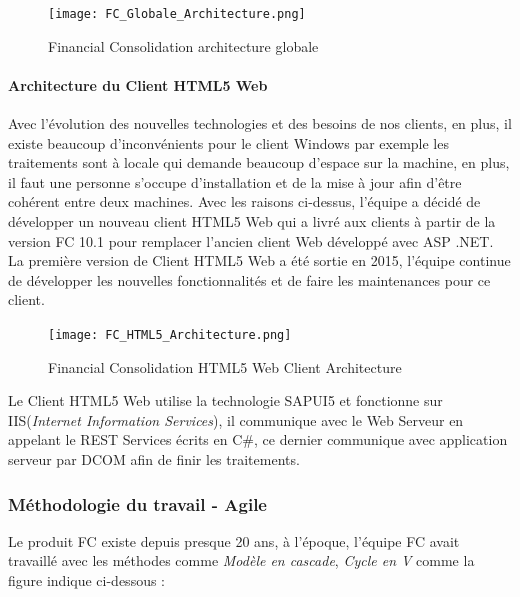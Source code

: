     \begin{figure}[H]
        \centering
        \texttt{[image: FC\_Globale\_Architecture.png]}
        \caption{Financial Consolidation architecture globale}
        \label{fig:FC_architecture_label}
    \end{figure}
    
    \paragraph{Architecture du Client HTML5 Web}
    Avec l'évolution des nouvelles technologies et des besoins de nos clients, en plus, il existe beaucoup d’inconvénients pour le client Windows par exemple les traitements sont à locale qui demande beaucoup d'espace sur la machine, en plus, il faut une personne  s'occupe d'installation et de la mise à jour afin d'être cohérent entre deux machines. Avec les raisons ci-dessus, l'équipe a décidé de développer un nouveau client HTML5 Web qui a livré aux clients à partir de la version FC 10.1 pour remplacer l'ancien client Web développé avec ASP .NET. La première version de Client HTML5 Web a été sortie en 2015, l'équipe continue de développer les nouvelles fonctionnalités et de faire les maintenances pour ce client.
    
    \begin{figure}[H]
        \centering
        \texttt{[image: FC\_HTML5\_Architecture.png]}
        \caption{Financial Consolidation HTML5 Web Client Architecture}
        \label{fig:FC_HTML5_Architecture_label}
    \end{figure}
    
    \par Le Client HTML5 Web utilise la technologie SAPUI5 et fonctionne sur IIS(\textit{Internet Information Services}), il communique avec le Web Serveur en appelant le REST Services écrits en C\#, ce dernier communique avec application serveur par DCOM afin de finir les traitements.
    
    \newpage
    \subsubsection{Méthodologie du travail - Agile}
    Le produit FC existe depuis presque 20 ans, à l'époque, l'équipe FC avait travaillé avec les méthodes comme \textit{Modèle en cascade}, \textit{Cycle en V} comme la figure indique ci-dessous : 
    
